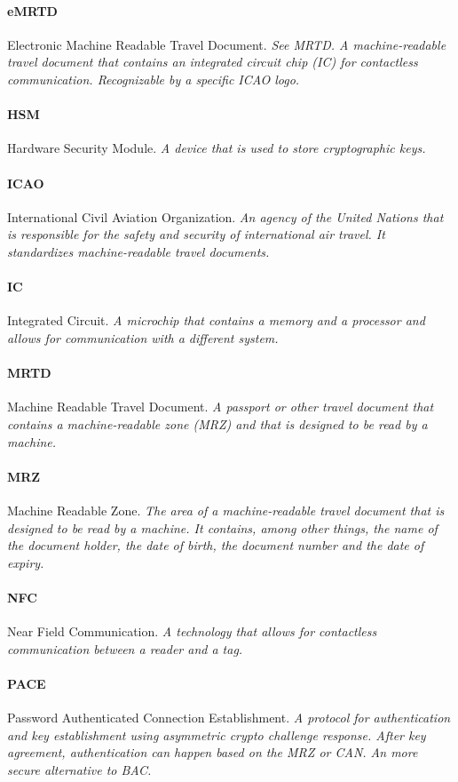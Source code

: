 \paragraph{eMRTD} Electronic Machine Readable Travel Document. \textit{See MRTD. A machine-readable travel document that contains an integrated circuit chip (IC) for contactless communication. Recognizable by a specific ICAO logo.}
\paragraph{HSM} Hardware Security Module. \textit{A device that is used to store cryptographic keys.}
\paragraph{ICAO} International Civil Aviation Organization. \textit{An agency of the United Nations that is responsible for the safety and security of international air travel. It standardizes machine-readable travel documents.}
\paragraph{IC} Integrated Circuit. \textit{A microchip that contains a memory and a processor and allows for communication with a different system.}
\paragraph{MRTD} Machine Readable Travel Document. \textit{A passport or other travel document that contains a machine-readable zone (MRZ) and that is designed to be read by a machine.}
\paragraph{MRZ} Machine Readable Zone. \textit{The area of a machine-readable travel document that is designed to be read by a machine. It contains, among other things, the name of the document holder, the date of birth, the document number and the date of expiry.}
\paragraph{NFC} Near Field Communication. \textit{A technology that allows for contactless communication between a reader and a tag.}
\paragraph{PACE} Password Authenticated Connection Establishment. \textit{A protocol for authentication and key establishment using asymmetric crypto challenge response. After key agreement, authentication can happen based on the MRZ or CAN. An more secure alternative to BAC.}
